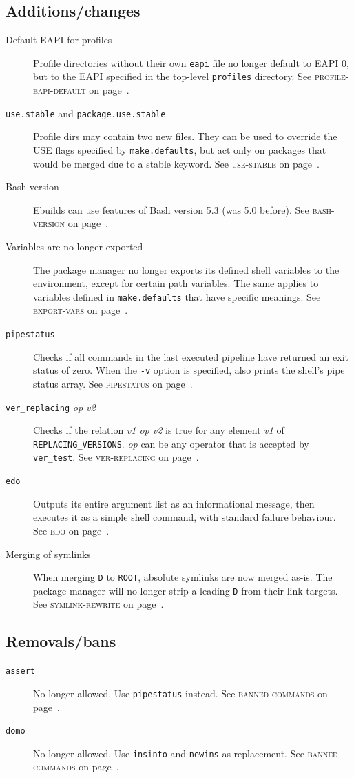 \documentclass[a4paper,nofoldmark]{leaflet}
\newcommand{\code}[1]{\texttt{#1}}
\newcommand{\featureref}[1]{\textsc{#1} on page~\pageref{feat:#1}}
\begin{document}
\subsection{Additions/changes}
\label{sec:cs:eapi9-additions}
\begin{description}
    \item[Default EAPI for profiles] Profile directories without their
    own \code{eapi} file no longer default to EAPI 0, but to the EAPI
    specified in the top-level \code{profiles} directory.
    See \featureref{profile-eapi-default}.
    \item[\code{use.stable} and \code{package.use.stable}]
    Profile dirs may contain two new files. They can be used to
    override the USE flags specified by \code{make.defaults}, but act
    only on packages that would be merged due to a stable keyword.
    See \featureref{use-stable}.
    \item[Bash version] Ebuilds can use features of Bash version 5.3
    (was 5.0 before). See \featureref{bash-version}.
    \item[Variables are no longer exported] The package manager no
    longer exports its defined shell variables to the environment,
    except for certain path variables. The same applies to variables
    defined in \code{make.defaults} that have specific meanings.
    See \featureref{export-vars}.
    \item[\code{pipestatus}] Checks if all commands in the last
    executed pipeline have returned an exit status of zero. When the
    \code{-v} option is specified, also prints the shell's pipe status
    array. See \featureref{pipestatus}.
    \item[\code{ver_replacing} \emph{op v2}] Checks if the relation
    \emph{v1 op v2} is true for any element \emph{v1} of
    \code{REPLACING_VERSIONS}\@. \emph{op} can be any operator that is
    accepted by \code{ver_test}. See \featureref{ver-replacing}.
    \item[\code{edo}] Outputs its entire argument list as an
    informational message, then executes it as a simple shell command,
    with standard failure behaviour. See \featureref{edo}.
    \item[Merging of symlinks] When merging \code{D} to \code{ROOT},
    absolute symlinks are now merged as-is. The package manager will
    no longer strip a leading \code{D} from their link targets.
    See \featureref{symlink-rewrite}.
\end{description}
\subsection{Removals/bans}
\label{sec:cs:eapi9-removalsbans}
\begin{description}
    \item[\code{assert}] No longer allowed. Use \code{pipestatus}
    instead. See \featureref{banned-commands}.
    \item[\code{domo}] No longer allowed. Use \code{insinto} and
    \code{newins} as replacement. See \featureref{banned-commands}.
\end{description}
\end{document}
